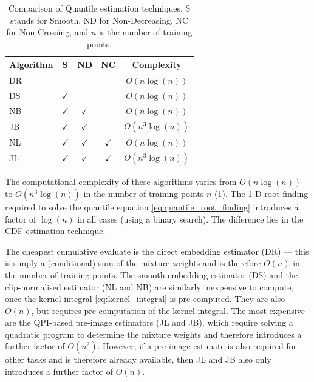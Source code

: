 \documentclass[twoside]{article} \usepackage{aistats2017}
\theoremstyle{definition}
\theoremstyle{theorem}
\newcommand{\qpi}{QPI}
\begin{document}
	\begin{table}[t!]
% 
% 
		\begin{center}
			\begin{tabular}{l|cccc}
				Algorithm & S & ND &   NC & Complexity \\ \hline
				DR  &              &                &                & $O(n \log(n))$    \\
				DS  & $\checkmark$ &                &                &
				$O(n \log(n))$  \\
				NB  & $\checkmark$ & $\checkmark$   &                &
				$O(n \log(n))$ \\
				JB  & $\checkmark$ & $\checkmark$   &                &
				$O(n^{3} \log(n))$ \\
				NL  & $\checkmark$ & $\checkmark$   & $\checkmark$   &
				$O(n \log(n))$ \\
				JL  & $\checkmark$ & $\checkmark$   & $\checkmark$   &   $O(n^{3} \log(n))$ 
			\end{tabular}
		\end{center}
		\caption{\small Comparison of Quantile estimation techniques. S stands for Smooth, ND for Non-Decreasing, NC for Non-Crossing, and $n$ is the number of training points.}
		\label{table:quantile_regression_methods}
	\end{table}
	
		
	The computational complexity of these algorithms varies from $O(n \log(n))$ to $O(n^{3} \log(n))$ in the number of training points $n$ (\cref{table:quantile_regression_methods}). The 1-D root-finding required to solve the quantile equation \eqref{eq:quantile_root_finding} introduces a factor of $\log(n)$ in all cases (using a binary search). The difference lies in the CDF estimation technique.
	
	The cheapest cumulative evaluate is the direct embedding estimator (DR) --- this is simply a (conditional) sum of the mixture weights and is therefore $O(n)$ in the number of training points. The smooth embedding estimator (DS) and the clip-normalised estimator (NL and NB) are similarly inexpensive to compute, once the kernel integral \eqref{eq:kernel_integral} is pre-computed. They are also $O(n)$, but requires pre-computation of the kernel integral. The most expensive are the \qpi-based pre-image estimators (JL and JB), which require solving a quadratic program to determine the mixture weights and therefore introduces a further factor of $O(n^2)$. However, if a pre-image estimate is also required for other tasks and is therefore already available, then JL and JB also only introduces a further factor of $O(n)$.
	
\end{document}
